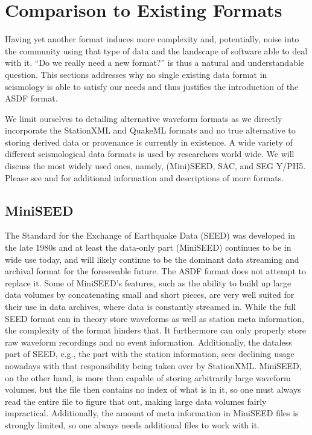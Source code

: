 \section{Comparison to Existing Formats}

Having yet another format induces more complexity and, potentially, noise into
the community using that type of data and the landscape of software able to
deal with it. ``Do we really need a new format?'' is thus a natural and
understandable question. This sections addresses why no single existing data
format in seismology is able to satisfy our needs and thus justifies the
introduction of the ASDF format.

We limit ourselves to detailing alternative waveform formats as we directly
incorporate the StationXML and QuakeML formats and no true alternative to
storing derived data or provenance is currently in existence.
A wide variety of different seismological data formats is used by researchers
world wide. We will discuss the most widely used ones, namely,
(Mini)SEED, SAC, and SEG Y/PH5.
Please see \cite{NMSOP-2} and \cite{Havskov} for additional information and
descriptions of more formats.


\subsection{MiniSEED}

The Standard for the Exchange of Earthquake Data (SEED) was developed in the
late 1980s and at least the data-only part (MiniSEED) continues to be in wide
use today, and will likely continue to be the dominant data streaming and
archival format for the foreseeable future. The ASDF format does not attempt to
replace it. Some of MiniSEED's features, such as the ability to build up large
data volumes by concatenating small and short pieces, are very well suited for
their use in data archives, where data is constantly streamed in.  While the
full SEED format can in theory store waveforms as well as station meta
information, the complexity of the format hinders that. It furthermore can only
properly store raw waveform recordings and no event information.  Additionally,
the dataless part of SEED, e.g., the part with the station information, sees
declining usage nowadays with that responsibility being taken over by
StationXML. MiniSEED, on the other hand, is more than capable of storing
arbitrarily large waveform volumes, but the file then contains no index of
what is in it, so one must always read the entire file to figure that out,
making large data volumes fairly impractical.  Additionally, the amount of
meta information in MiniSEED files is strongly limited, so one always needs
additional files to work with it.

